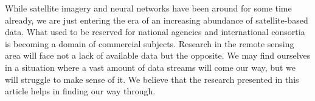 While satellite imagery and neural networks have been around for some time already, we
are just entering the era of an increasing abundance of satellite-based data. What used
to be reserved for national agencies and international consortia is becoming a domain of
commercial subjects. Research in the remote sensing area will face not a lack of
available data but the opposite. We may find ourselves in a situation where a vast
amount of data streams will come our way, but we will struggle to make sense of it. We
believe that the research presented in this article helps in finding our way through.
